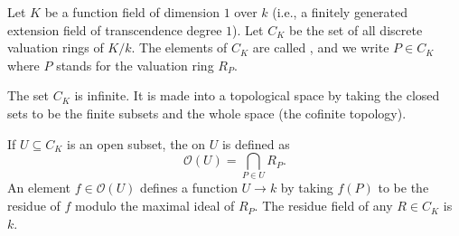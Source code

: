 Let $K$ be a function field of dimension $1$ over $k$ (i.e., a finitely generated extension field of transcendence degree $1$). Let $C_K$ be the set of all discrete valuation rings of $K/k$. The elements of $C_K$ are called , and we write $P \in C_K$ where $P$ stands for the valuation ring $R_P$.

The set $C_K$ is infinite. It is made into a topological space by taking the closed sets to be the finite subsets and the whole space (the cofinite topology).

If $U \subseteq C_K$ is an open subset, the  on $U$ is defined as
$$\mathcal{O}(U) = \bigcap_{P \in U} R_P.$$
An element $f \in \mathcal{O}(U)$ defines a function $U \to k$ by taking $f(P)$ to be the residue of $f$ modulo the maximal ideal of $R_P$. The residue field of any $R \in C_K$ is $k$.
